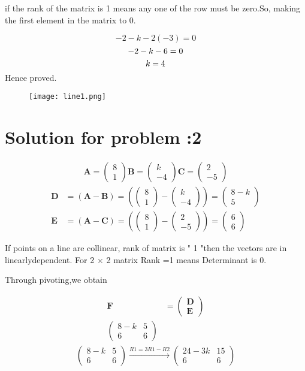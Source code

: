\documentclass[12pt]{article}
\providecommand{\brak}[1]{\ensuremath{\left(#1\right)}}
\newcommand{\myvec}[1]{\ensuremath{\begin{pmatrix}#1\end{pmatrix}}}
\let\vec\mathbf
\begin{document}
if the rank of the matrix is 1 means any one of the row must be zero.So, making the first element in the matrix to 0.

\begin{equation}
-2-k-2(-3)=0
\end{equation} 
\begin{equation}
-2-k-6=0\\
\end{equation} 
\begin{equation}
k=4 \\
\end{equation} 
Hence proved.
\begin{figure}[h!]
	  \centering 
	  \texttt{[image: line1.png]}
	  \caption{}
	  \label{fig:line1.png}
	  \end{figure} 	    
\section{Solution for problem :2}
\begin{align}  
\vec{A}=\myvec{8 \\ 1}
\vec{B}=\myvec{k \\ -4}
\vec{C}=\myvec{2 \\ -5}
\end{align}
\begin{align}  
 \vec{D} &=\brak{\vec{A}-\vec{B}} = \brak{\myvec{8 \\1 } - \myvec{k \\-4 } } = \myvec{8-k \\ 5 }\\
\vec{E} &= \brak{\vec{A}-\vec{C}} = \brak{\myvec{8 \\ 1 } - \myvec{2 \\-5 } } = \myvec{6 \\6}
\end{align}

If points on a line  are  collinear, rank of matrix is " 1 "then the vectors are in linearlydependent.
For 2 × 2 matrix Rank =1 means Determinant is 0.

Through pivoting,we obtain

\begin{align}
\vec{F} &={\myvec{\vec{D}\\ \vec{E}}}\\
\begin{pmatrix}
8-k & 5 \\
6 & 6 
\end{pmatrix}
\end{align}
\begin{align}
\begin{pmatrix}
8-k & 5 \\ 
6& 6
\end{pmatrix}\overset{R1=3R1-R2}{\rightarrow}
\begin{pmatrix}
24-3k & 15 \\ 
 6& 6
\end{pmatrix}
\end{align}
\end{document}
